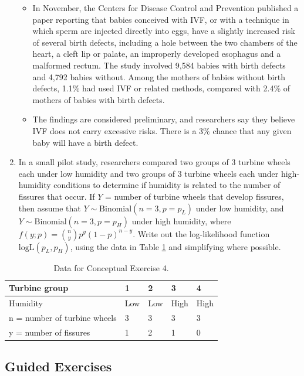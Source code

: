 \documentclass[
]{krantz}
\begin{document}
\begin{enumerate}
  \begin{itemize}
  \item
    In November, the Centers for Disease Control and Prevention published a paper reporting that babies conceived with IVF, or with a technique in which sperm are injected directly into eggs, have a slightly increased risk of several birth defects, including a hole between the two chambers of the heart, a cleft lip or palate, an improperly developed esophagus and a malformed rectum. The study involved 9,584 babies with birth defects and 4,792 babies without. Among the mothers of babies without birth defects, 1.1\% had used IVF or related methods, compared with 2.4\% of mothers of babies with birth defects.
  \item
    The findings are considered preliminary, and researchers say they believe IVF does not carry excessive risks. There is a 3\% chance that any given baby will have a birth defect.
  \end{itemize}
\item
  In a small pilot study, researchers compared two groups of 3 turbine wheels each under low humidity and two groups of 3 turbine wheels each under high-humidity conditions to determine if humidity is related to the number of fissures that occur. If \(Y\) = number of turbine wheels that develop fissures, then assume that \(Y \sim \textrm{Binomial}(n=3, p=p_L)\) under low humidity, and \(Y \sim \textrm{Binomial}(n=3, p=p_H)\) under high humidity, where \(f(y;p)=\binom{n}{y} p^y (1-p)^{n-y}\). Write out the log-likelihood function \(\textrm{logL}(p_L, p_H)\), using the data in Table \ref{tab:fissurechp6} and simplifying where possible.
\end{enumerate}

\begin{table}
\centering
\caption{\label{tab:fissurechp6}Data for Conceptual Exercise 4.}
\centering
\begin{tabular}[t]{>{\raggedright\arraybackslash}p{5cm}llll}
\toprule
Turbine group & 1 & 2 & 3 & 4\\
\midrule
Humidity & Low & Low & High & High\\
n = number of turbine wheels & 3 & 3 & 3 & 3\\
y = number of fissures & 1 & 2 & 1 & 0\\
\bottomrule
\end{tabular}
\end{table}

\subsection{Guided Exercises}\label{guided-exercises-4}
\end{document}

